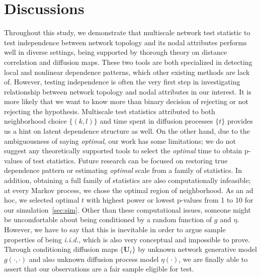\documentclass[12pt]{article}
\theoremstyle{definition}
\begin{document}
\section{Discussions}
\label{sec:discussion}
	
Throughout this study, we demonstrate that multiscale network test statistic to test  independence between network topology and its nodal attributes performs well in diverse settings, being supported by thorough theory on distance correlation and diffusion maps. These two tools are both specialized in detecting local and nonlinear dependence patterns, which other existing methods are lack of. However, testing independence is often the very first step in investigating relationship between network topology and nodal attributes in our interest. It is more likely that we want to know more than binary decision of rejecting or not rejecting the hypothesis. Multiscale test statistics attributed to both neighborhood choice $\{ (k,l)  \}$ and time spent in diffusion processes $\{ t \}$ provides us a hint on latent dependence structure as well. On the other hand, due to the ambiguousness of saying \textit{optimal}, our work has some limitations; we do not suggest any theoretically supported tools to select the \textit{optimal} time to obtain p-values of test statistics. Future research can be focused on restoring true dependence pattern or estimating \textit{optimal} scale from a family of statistics. In addition, obtaining a full family of statistics are also computationally infeasible; at every Markov process, we chose the optimal region of neighborhood. As an ad hoc, we selected optimal $t$ with highest power or lowest p-values from 1 to 10 for our simulation~\ref{sec:sim}.  Other than these computational issues, someone might be uncomfortable about being conditioned by a random function of $g$ and $\eta$.  However, we have to say that this is inevitable in order to argue sample properties of being \textit{i.i.d.}, which is also very conceptual and impossible to prove. Through conditioning diffusion maps $\{ \mathbf{U}_{t} \}$ by unknown network generative model $g(\cdot, \cdot)$ and also unknown diffusion process model $\eta(\cdot)$, we are finally able to assert that our observations are a fair sample eligible for test. 
	
\end{document}

